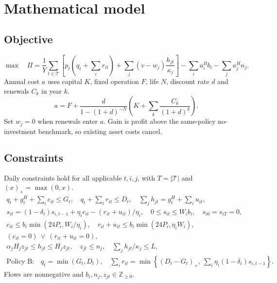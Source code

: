\section{Mathematical model}\label{sec:model1}
\subsection{Objective}
\begin{equation}
\max\quad \Pi =
\frac{1}{Y}\sum_{t\in\mathcal T}
\left[p_t\left(q_t+\sum_i r_{it}\right)+
\sum_j (v-w_j)\frac{h_{jt}}{\kappa_j}\right]
-\sum_i a_i^B b_i-\sum_j a_j^H n_j .
\label{eq:profit}
\end{equation}
Annual cost \(a\) uses capital \(K\), fixed operation \(F\), life \(N\),
discount rate \(d\) and renewals \(C_k\) in year \(k\).
\begin{equation}
a=F+\frac{d}{1-(1+d)^{-N}}
\left(K+\sum_k\frac{C_k}{(1+d)^k}\right).
\label{eq:annualcost}
\end{equation}
Set \(w_j=0\) when renewals enter \(a\). Gain is profit above the
same-policy no-investment benchmark, so existing asset costs cancel.

\subsection{Constraints}
Daily constraints hold for all applicable \(t,i,j\), with \(T=|\mathcal T|\)
and \((x)_+=\max(0,x)\).
{\setlength{\jot}{6pt}
\begin{gather}
 q_t+g_t^H+\sum_i c_{it}\le G_t,\quad
 q_t+\sum_i r_{it}\le D_t,\quad
 \sum_j h_{jt}=g_t^H+\sum_i u_{it}, \label{eq:flow}\\
 s_{it}=(1-\delta_i)s_{i,t-1}+\eta_i c_{it}-(r_{it}+u_{it})/\eta_i,
 \quad 0\le s_{it}\le W_i b_i,\quad s_{i0}=s_{iT}=0, \label{eq:stock}\\
 c_{it}\le b_i\min(24P_i,W_i/\eta_i),\quad
 r_{it}+u_{it}\le b_i\min(24P_i,\eta_i W_i), \label{eq:window}\\
 (c_{it}=0)\ \lor\ (r_{it}+u_{it}=0), \label{eq:direction}\\
 \alpha_j H_j z_{jt}\le h_{jt}\le H_j z_{jt},\quad
 z_{jt}\le n_j,\quad \sum_j h_{jt}/\kappa_j\le L, \label{eq:hydrogen}\\
 \text{Policy B:}\quad q_t=\min(G_t,D_t), \quad
 \sum_i r_{it}=\min\!\left\{(D_t-G_t)_+,\
                   \sum_i\eta_i(1-\delta_i)s_{i,t-1}\right\}. \label{eq:priority}
\end{gather}}
Flows are nonnegative and \(b_i,n_j,z_{jt}\in\mathbb Z_{\ge0}\).

